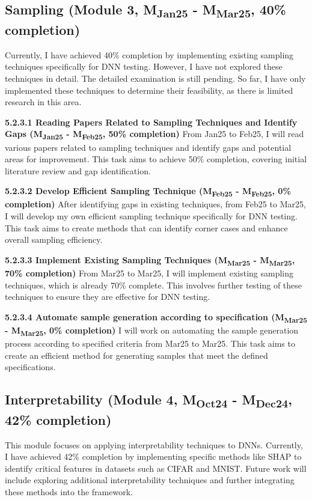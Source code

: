 \subsection{Sampling (Module 3, M\textsubscript{Jan25} - M\textsubscript{Mar25}, 40\% completion)} Currently, I have achieved 40\% completion by implementing existing sampling techniques specifically for DNN testing. However, I have not explored these techniques in detail. The detailed examination is still pending. So far, I have only implemented these techniques to determine their feasibility, as there is limited research in this area.

\noindent \textbf{5.2.3.1 Reading Papers Related to Sampling Techniques and Identify Gaps (M\textsubscript{Jan25} - M\textsubscript{Feb25}, 50\% completion)} From Jan25 to Feb25, I will read various papers related to sampling techniques and identify gaps and potential areas for improvement. This task aims to achieve 50\% completion, covering initial literature review and gap identification.

\noindent \textbf{5.2.3.2 Develop Efficient Sampling Technique (M\textsubscript{Feb25} - M\textsubscript{Feb25}, 0\% completion)} After identifying gaps in existing techniques, from Feb25 to Mar25, I will develop my own efficient sampling technique specifically for DNN testing. This task aims to create methods that can identify corner cases and enhance overall sampling efficiency.

\noindent \textbf{5.2.3.3 Implement Existing Sampling Techniques (M\textsubscript{Mar25} - M\textsubscript{Mar25}, 70\% completion)} From Mar25 to Mar25, I will implement existing sampling techniques, which is already 70\% complete. This involves further testing of these techniques to ensure they are effective for DNN testing.

\noindent \textbf{5.2.3.4 Automate sample generation according to specification (M\textsubscript{Mar25} - M\textsubscript{Mar25}, 0\% completion)} I will work on automating the sample generation process according to specified criteria from Mar25 to Mar25. This task aims to create an efficient method for generating samples that meet the defined specifications.





\subsection{Interpretability (Module 4, M\textsubscript{Oct24} - M\textsubscript{Dec24}, 42\% completion)} This module focuses on applying interpretability techniques to DNNs. Currently, I have achieved 42\% completion by implementing specific methods like SHAP to identify critical features in datasets such as CIFAR and MNIST. Future work will include exploring additional interpretability techniques and further integrating these methods into the framework.

